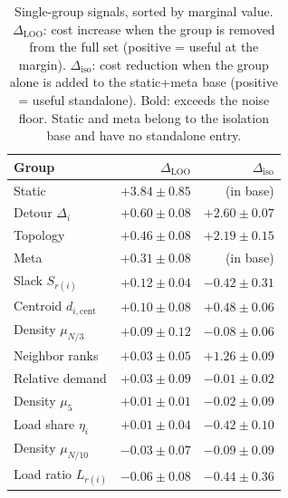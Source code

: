 \documentclass[letterpaper]{article} %
\begin{document}
\begin{table}[t]
\centering
\small
\begin{tabular}{lrr}
\toprule
\textbf{Group} & \textbf{$\Delta_{\mathrm{LOO}}$} & \textbf{$\Delta_{\mathrm{iso}}$} \\
\midrule
Static & $\mathbf{+3.84 \pm 0.85}$ & (in base) \\
Detour $\Delta_i$ & $\mathbf{+0.60 \pm 0.08}$ & $\mathbf{+2.60 \pm 0.07}$ \\
Topology & $\mathbf{+0.46 \pm 0.08}$ & $\mathbf{+2.19 \pm 0.15}$ \\
Meta & $\mathbf{+0.31 \pm 0.08}$ & (in base) \\
Slack $S_{r(i)}$ & $+0.12 \pm 0.04$ & $-0.42 \pm 0.31$ \\
Centroid $d_{i,\mathrm{cent}}$ & $+0.10 \pm 0.08$ & $\mathbf{+0.48 \pm 0.06}$ \\
Density $\mu_{N/3}$ & $+0.09 \pm 0.12$ & $-0.08 \pm 0.06$ \\
Neighbor ranks & $+0.03 \pm 0.05$ & $\mathbf{+1.26 \pm 0.09}$ \\
Relative demand & $+0.03 \pm 0.09$ & $-0.01 \pm 0.02$ \\
Density $\mu_5$ & $+0.01 \pm 0.01$ & $-0.02 \pm 0.09$ \\
Load share $\eta_i$ & $+0.01 \pm 0.04$ & $-0.42 \pm 0.10$ \\
Density $\mu_{N/10}$ & $-0.03 \pm 0.07$ & $-0.09 \pm 0.09$ \\
Load ratio $L_{r(i)}$ & $-0.06 \pm 0.08$ & $-0.44 \pm 0.36$ \\
\bottomrule
\end{tabular}
\caption{Single-group signals, sorted by marginal value. $\Delta_{\mathrm{LOO}}$: cost increase when the group is removed from the full set (positive = useful at the margin). $\Delta_{\mathrm{iso}}$: cost reduction when the group alone is added to the static+meta base (positive = useful standalone). Bold: exceeds the noise floor. Static and meta belong to the isolation base and have no standalone entry.}
\label{tab:looiso}
\end{table}
\end{document}
